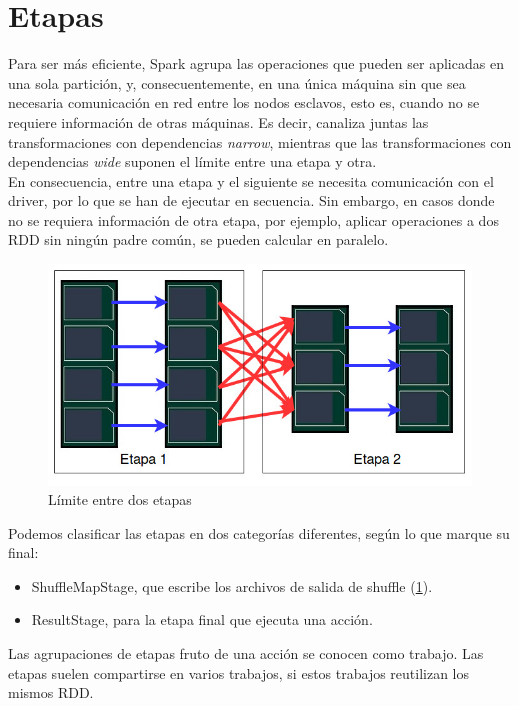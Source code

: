 \section{Etapas}
Para ser más eficiente, Spark agrupa las operaciones que pueden ser aplicadas en una sola partición, y, consecuentemente, en una única máquina sin que sea necesaria comunicación en red entre los nodos esclavos, esto es, cuando no se requiere información de otras máquinas. Es decir, canaliza juntas las transformaciones con dependencias \textit{narrow}, mientras que las transformaciones con dependencias \textit{wide} suponen el límite entre una etapa y otra.\\

En consecuencia, entre una etapa y el siguiente se necesita comunicación con el driver, por lo que se han de ejecutar en secuencia. Sin embargo, en casos donde no se requiera información de otra etapa, por ejemplo, aplicar operaciones a dos RDD sin ningún padre común, se pueden calcular en paralelo.\\

\begin{figure}[t]
	\includegraphics[scale=0.6]{img/etapas} 
	\centering
	\caption{Límite entre dos etapas}
	\label{etapas}
\end{figure}

Podemos clasificar las etapas en dos categorías diferentes, según lo que marque su final:\\

\begin{itemize}
\item ShuffleMapStage, que escribe los archivos de salida de shuffle (\ref{etapas}).
\item ResultStage, para la etapa final que ejecuta una acción.
\end{itemize}

Las agrupaciones de etapas fruto de una acción se conocen como trabajo. Las etapas suelen compartirse en varios trabajos, si estos trabajos reutilizan los mismos RDD.\\

